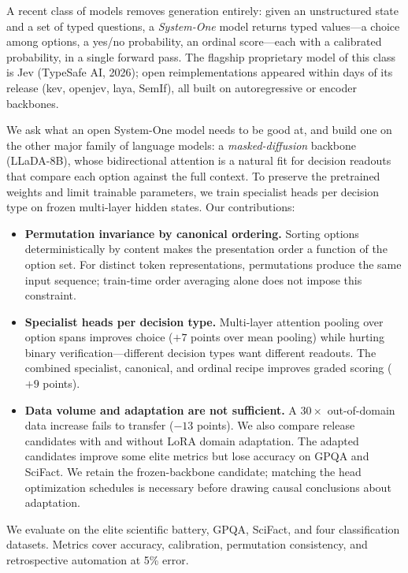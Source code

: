 \documentclass[11pt]{article}
\begin{document}
A recent class of models removes generation entirely: given an
unstructured state and a set of typed questions, a \emph{System-One}
model returns typed values---a choice among options, a yes/no
probability, an ordinal score---each with a calibrated probability, in a
single forward pass. The flagship proprietary model of this class is
Jev (TypeSafe AI, 2026); open reimplementations appeared within days of
its release (kev, openjev, laya, SemIf), all built on autoregressive or
encoder backbones.

We ask what an open System-One model needs to be good at, and build one
on the other major family of language models: a \emph{masked-diffusion}
backbone (LLaDA-8B), whose bidirectional attention is a natural fit for
decision readouts that compare each option against the full context.
To preserve the pretrained weights and limit trainable parameters, we
train specialist heads per decision type on frozen multi-layer hidden
states. Our contributions:

\begin{itemize}
\item \textbf{Permutation invariance by canonical ordering.}
Sorting options deterministically by content makes the presentation
order a function of the option set. For distinct token representations,
permutations produce the same input sequence; train-time order averaging
alone does not impose this constraint.
\item \textbf{Specialist heads per decision type.} Multi-layer
attention pooling over option spans improves choice ($+7$ points over
mean pooling) while hurting binary verification---different decision
types want different readouts. The combined specialist, canonical, and
ordinal recipe improves graded scoring ($+9$ points).
\item \textbf{Data volume and adaptation are not sufficient.} A
$30\times$ out-of-domain data increase fails to transfer ($-13$ points).
We also compare release candidates with and without LoRA domain
adaptation. The adapted candidates improve some elite metrics but lose
accuracy on GPQA and SciFact. We retain the frozen-backbone candidate;
matching the head optimization schedules is necessary before drawing
causal conclusions about adaptation.
\end{itemize}

We evaluate on the elite scientific battery, GPQA, SciFact, and four
classification datasets. Metrics cover accuracy, calibration, permutation
consistency, and retrospective automation at 5\% error.
\end{document}
